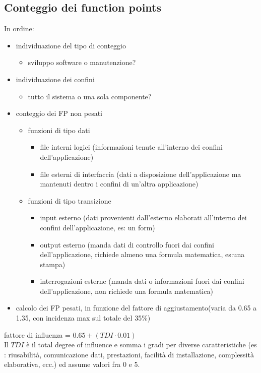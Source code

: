\documentclass[a4paper,12pt]{report}
\begin{document}
	\subsection{Conteggio dei function points}
	In ordine:
	\begin{itemize}
		\item individuazione del tipo di conteggio
		\begin{itemize}
			\item sviluppo software o manutenzione?
		\end{itemize}
		\item individuazione dei confini
		\begin{itemize}
			\item tutto il sistema o una sola componente?
		\end{itemize}
		\item conteggio dei FP non pesati
		\begin{itemize}
			\item funzioni di tipo dati
			\begin{itemize}
				\item file interni logici (informazioni tenute all'interno dei confini dell'applicazione)
				\item file esterni di interfaccia (dati a disposizione dell'applicazione ma mantenuti dentro i confini di un'altra applicazione)
			\end{itemize}
			\item funzioni di tipo transizione
			\begin{itemize}
				\item input esterno (dati provenienti dall'esterno elaborati all'interno dei confini dell'applicazione, es: un form)
				\item output esterno (manda dati di controllo fuori dai confini dell'applicazione, richiede almeno una formula matematica, es:una stampa)
				\item interrogazioni esterne (manda dati o informazioni fuori dai confini dell'applicazione, non richiede una formula matematica)
			\end{itemize}
		\end{itemize}
		\item calcolo dei FP pesati, in funzione del fattore di aggiustamento(varia da 0.65 a 1.35, con incidenza max sul totale del 35\%)
	\end{itemize}
	fattore di influenza = $0.65 + (TDI \cdot 0.01)$ \\
	Il $TDI$ è il total degree of influence e somma i gradi per diverse caratteristiche (es : riusabilità, comunicazione dati, prestazioni, facilità di installazione, complessità elaborativa, ecc.) ed assume valori fra 0 e 5.
\end{document}
